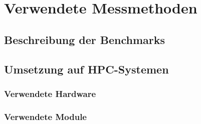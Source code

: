 \section{Verwendete Messmethoden}
\label{methoden}

\subsection{Beschreibung der Benchmarks}
\label{methoden:benchmarks}

\subsection{Umsetzung auf HPC-Systemen}
\label{methoden:systeme}

\subsubsection{Verwendete Hardware}
\label{methoden:systeme:hardware}

\subsubsection{Verwendete Module}
\label{methoden:systememodule}

